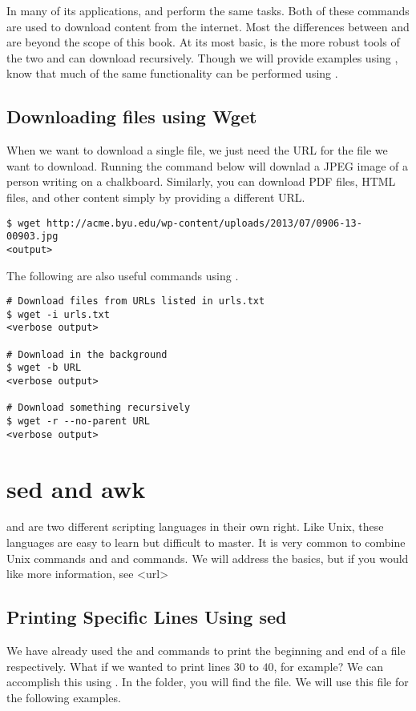 In many of its applications,  and  perform the same tasks. Both of these commands are used to download content from the internet. Most the differences between  and  are beyond the scope of this book. 
At its most basic,  is the more robust tools of the two and  can download recursively. Though we will provide examples using , know that much of the same functionality can be performed using .

\subsection*{Downloading files using Wget}

When we want to download a single file, we just need the URL for the file we want to download. Running the command below will downlad a JPEG image of a person writing on a chalkboard. Similarly, you can download PDF files, HTML files, and other content simply by providing a different URL. 

\begin{lstlisting}
$ wget http://acme.byu.edu/wp-content/uploads/2013/07/0906-13-00903.jpg
<output> 
\end{lstlisting}

The following are also useful commands using .

\begin{lstlisting}
# Download files from URLs listed in urls.txt
$ wget -i urls.txt
<verbose output> 

# Download in the background
$ wget -b URL
<verbose output>

# Download something recursively
$ wget -r --no-parent URL
<verbose output>

\end{lstlisting}

\section*{sed and awk}
 and  are two different scripting languages in their own right. Like Unix, these languages are easy to learn but difficult to master. It is very common to combine Unix commands and  and  commands. We will address the basics, but if you would like more information, see <url>

\subsection*{Printing Specific Lines Using sed}
We have already used the  and  commands to print the beginning and end of a file respectively. What if we wanted to print lines $30$ to $40$, for example? We can accomplish this using . In the  folder, you will find the  file. We will use this file for the following examples.

